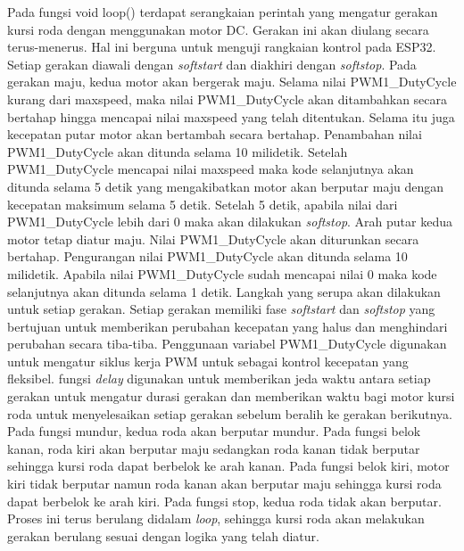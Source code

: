 Pada fungsi void loop() terdapat serangkaian perintah yang mengatur gerakan kursi roda dengan menggunakan motor DC. Gerakan ini akan diulang secara terus-menerus. Hal ini berguna untuk menguji rangkaian kontrol pada ESP32. Setiap gerakan diawali dengan \emph{softstart} dan diakhiri dengan \emph{softstop}. Pada gerakan maju, kedua motor akan bergerak maju. Selama nilai PWM1\_DutyCycle kurang dari maxspeed, maka nilai PWM1\_DutyCycle akan ditambahkan secara bertahap hingga mencapai nilai maxspeed yang telah ditentukan. Selama itu juga kecepatan putar motor akan bertambah secara bertahap. Penambahan nilai PWM1\_DutyCycle akan ditunda selama 10 milidetik. Setelah PWM1\_DutyCycle mencapai nilai maxspeed maka kode selanjutnya akan ditunda selama 5 detik yang mengakibatkan motor akan berputar maju dengan kecepatan maksimum selama 5 detik. Setelah 5 detik, apabila nilai dari PWM1\_DutyCycle lebih dari 0 maka akan dilakukan \emph{softstop}. Arah putar kedua motor tetap diatur maju. Nilai PWM1\_DutyCycle akan diturunkan secara bertahap. Pengurangan nilai PWM1\_DutyCycle akan ditunda selama 10 milidetik. Apabila nilai PWM1\_DutyCycle sudah mencapai nilai 0 maka kode selanjutnya akan ditunda selama 1 detik. Langkah yang serupa akan dilakukan untuk setiap gerakan. Setiap gerakan memiliki fase \emph{softstart} dan \emph{softstop} yang bertujuan untuk memberikan perubahan kecepatan yang halus dan menghindari perubahan secara tiba-tiba. Penggunaan variabel PWM1\_DutyCycle digunakan untuk mengatur siklus kerja PWM untuk sebagai kontrol kecepatan yang fleksibel. fungsi \emph{delay} digunakan untuk memberikan jeda waktu antara setiap gerakan untuk mengatur durasi gerakan dan memberikan waktu bagi motor kursi roda untuk menyelesaikan setiap gerakan sebelum beralih ke gerakan berikutnya. Pada fungsi mundur, kedua roda akan berputar mundur. Pada fungsi belok kanan, roda kiri akan berputar maju sedangkan roda kanan tidak berputar sehingga kursi roda dapat berbelok ke arah kanan. Pada fungsi belok kiri, motor kiri tidak berputar namun roda kanan akan berputar maju sehingga kursi roda dapat berbelok ke arah kiri. Pada fungsi stop, kedua roda tidak akan berputar. Proses ini terus berulang didalam \emph{loop}, sehingga kursi roda akan melakukan gerakan berulang sesuai dengan logika yang telah diatur.


